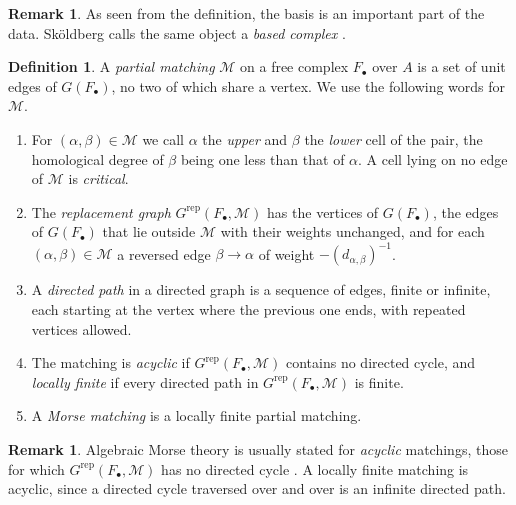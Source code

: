 \documentclass[12pt]{amsart}
\theoremstyle{plain}
\theoremstyle{definition}
\newtheorem{definition}[theorem]{Definition}
\newtheorem{remark}[theorem]{Remark}
\newcommand{\F}{ {F_\bullet} }
\newcommand{\M}{\mathcal{M}}
\newcommand{\Grep}{G^{\mathrm{rep}}}
\begin{document}
\begin{remark}
     As seen from the definition, the basis is an important part of the data.
    Sk\"oldberg calls the same object a \emph{based complex} \cite[\S2]{Skoldberg}.
\end{remark}

\begin{definition}\label{def:matching}
    A \emph{partial matching} $\M$ on a free complex $\F$ over $A$ is a set of unit edges of $G(\F)$, no two of which share a vertex. We use the following words for $\M$.

    \begin{enumerate}[label=(\arabic*),leftmargin=*,itemsep=1pt]
        \item For $(\alpha, \beta) \in \M$ we call $\alpha$ the \emph{upper} and $\beta$ the \emph{lower} cell of the pair, the homological degree of $\beta$ being one less than that of $\alpha$. A cell lying on no edge of $\M$ is \emph{critical}.

        \item The \emph{replacement graph} $\Grep(\F, \M)$ has the vertices of $G(\F)$, the edges of $G(\F)$ that lie outside $\M$ with their weights unchanged, and for each $(\alpha, \beta) \in \M$ a reversed edge $\beta \to \alpha$ of weight $-(d_{\alpha,\beta})^{-1}$.

        \item A \emph{directed path} in a directed graph is a sequence of edges, finite or infinite, each starting at the vertex where the previous one ends, with repeated vertices allowed.

        \item The matching is \emph{acyclic} if $\Grep(\F, \M)$ contains no directed cycle, and \emph{locally finite} if every directed path in $\Grep(\F, \M)$ is finite.

        \item A \emph{Morse matching} is a locally finite partial matching.
    \end{enumerate}
\end{definition}

\begin{remark}\label{rem:acyclic}
    Algebraic Morse theory is usually stated for \emph{acyclic} matchings, those for which $\Grep(\F, \M)$ has no directed cycle \cite{Skoldberg,JollenbeckWelker}. A locally finite matching is acyclic, since a directed cycle traversed over and over is an infinite directed path.
\end{remark}
\end{document}
